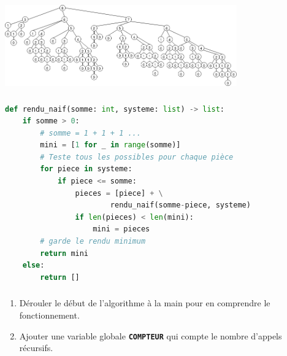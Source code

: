 \documentclass[svgnames,11pt]{beamer}
\begin{document}
\begin{frame}
    \frametitle{}

    \begin{center}
        \centering
        \includegraphics[width=10cm]{ressources/appel-naif-8.png}
        \label{IMG}
    \end{center}

\end{frame}
\begin{frame}[fragile]
    \frametitle{}

\begin{center}
\begin{lstlisting}[language=Python , basicstyle=\ttfamily\small, xleftmargin=0.2em, xrightmargin=-2em]
def rendu_naif(somme: int, systeme: list) -> list:
    if somme > 0:
        # somme = 1 + 1 + 1 ...
        mini = [1 for _ in range(somme)]  
        # Teste tous les possibles pour chaque pièce
        for piece in systeme:
            if piece <= somme:
                pieces = [piece] + \
                        rendu_naif(somme-piece, systeme)
                if len(pieces) < len(mini):
                    mini = pieces
        # garde le rendu minimum
        return mini
    else:
        return []
\end{lstlisting}
\end{center}
\end{frame}
\begin{frame}
    \frametitle{}

    
\begin{activite}
    \begin{enumerate}
        \item Dérouler le début de l'algorithme à la main pour en comprendre le fonctionnement.
        \item Ajouter une variable globale \textbf{\texttt{COMPTEUR}} qui compte le nombre d'appels récursifs.
    \end{enumerate}
    \end{activite}

\end{frame}
\end{document}
